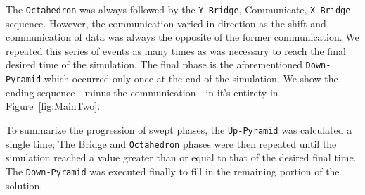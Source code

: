 \documentclass[review]{elsarticle}
\def\Up{\texttt{Up-Pyramid}}
\def\Down{\texttt{Down-Pyramid}}
\def\Oct{\texttt{Octahedron}}
\def\Xb{\texttt{X-Bridge}}
\def\Yb{\texttt{Y-Bridge}}
\begin{document}
\par
The \Oct{} was always followed by the \Yb{}, Communicate, \Xb{} sequence. However, the communication varied in direction as the shift and communication of data was always the opposite of the former communication. We repeated this series of events as many times as was necessary to reach the final desired time of the simulation. The final phase is the aforementioned \Down{} which occurred only once at the end of the simulation. We show the ending sequence---minus the communication---in it's entirety in Figure~\ref{fig:MainTwo}. 
\par
To summarize the progression of swept phases, the \Up{} was calculated a single time; The Bridge and \Oct{} phases were then repeated until the simulation reached a value greater than or equal to that of the desired final time. The \Down{} was executed finally to fill in the remaining portion of the solution.
\end{document}
